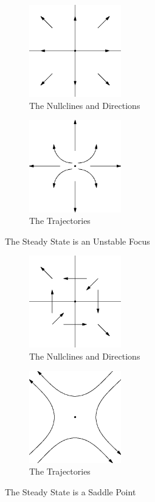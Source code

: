 \documentclass[fleqn,letterpaper]{report}
\begin{document}
\begin{figure}[h!]
\centering
\begin{subfigure}{.5\textwidth}
\centering
\includegraphics[width=4cm]{figure31.eps}
\caption{The Nullclines and Directions}
\end{subfigure}%
\begin{subfigure}{.5\textwidth}
\centering
\includegraphics[width=4cm]{figure51.eps}
\caption{The Trajectories}
\end{subfigure}
\caption{The Steady State is an Unstable Focus}
\label{figure-unstable-focus}
\end{figure}

\begin{figure}[h!]
\centering
\begin{subfigure}{.5\textwidth}
\centering
\includegraphics[width=4cm]{figure34.eps}
\caption{The Nullclines and Directions}
\end{subfigure}%
\begin{subfigure}{.5\textwidth}
\centering
\includegraphics[width=4cm]{figure49.eps}
\caption{The Trajectories}
\end{subfigure}
\caption{The Steady State is a Saddle Point}
\label{figure-saddle-point}
\end{figure}
\end{document}
